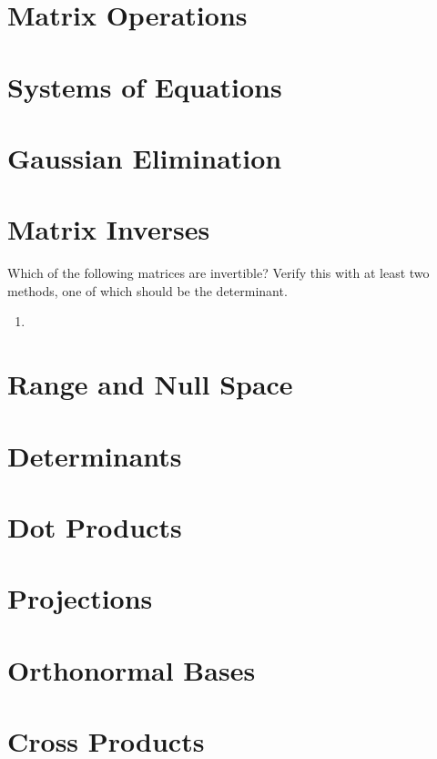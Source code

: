 \documentclass{ximera}
\begin{document}
\section*{Matrix Operations}


\section*{Systems of Equations}

\section*{Gaussian Elimination}


\section*{Matrix Inverses}

\begin{example}
    Which of the following matrices are invertible? Verify this with at least two methods, one of which should be the determinant.

    \begin{enumerate}
        \item 
    \end{enumerate}
\end{example}

\section*{Range and Null Space}

\section*{Determinants}


\section*{Dot Products}

\section*{Projections}

\section*{Orthonormal Bases}

\section*{Cross Products}
\end{document}
